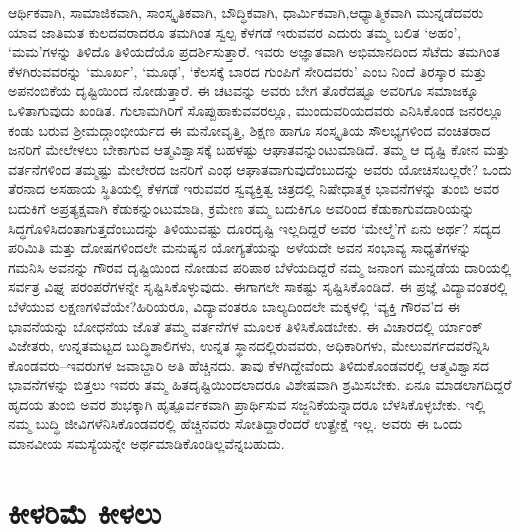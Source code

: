 ಆರ್ಥಿಕವಾಗಿ, ಸಾಮಾಜಿಕವಾಗಿ, ಸಾಂಸ್ಕೃತಿಕವಾಗಿ, ಬೌದ್ಧಿಕವಾಗಿ, ಧಾರ್ಮಿಕವಾಗಿ,\break ಆಧ್ಯಾತ್ಮಿಕವಾಗಿ ಮುನ್ನಡೆದವರು ಯಾವ ಜಾತಿಮತ ಕುಲದವರಾದರೂ ತಮಗಿಂತ ಸ್ವಲ್ಪ ಕೆಳಗಡೆ ಇರುವವರ ಎದುರು ತಮ್ಮ ಬಲಿತ ‘ಅಹಂ’, ‘ಮಮ’ಗಳನ್ನು ತಿಳಿದೊ ತಿಳಿಯದೆಯೊ ಪ್ರದರ್ಶಿಸು\-ತ್ತಾರೆ. ಇವರು ಅಜ್ಞಾತವಾಗಿ ಅಭಿಮಾನದಿಂದ ಸೆಟೆದು ತಮಗಿಂತ ಕೆಳಗಿರುವವರನ್ನು ‘ಮೂರ್ಖ’, ‘ಮೂಢ’, ‘ಕೆಲಸಕ್ಕೆ ಬಾರದ ಗುಂಪಿಗೆ ಸೇರಿದವರು’ ಎಂಬ ನಿಂದೆ ತಿರಸ್ಕಾರ ಮತ್ತು ಅಪನಂಬಿಕೆಯ ದೃಷ್ಟಿಯಿಂದ ನೋಡುತ್ತಾರೆ. ಈ ಚಟವನ್ನು ಅವರು ಬೇಗ ತೊರೆದಷ್ಟೂ ಅವರಿಗೂ ಸಮಾಜಕ್ಕೂ ಒಳಿತಾಗುವುದು ಖಂಡಿತ. ಗುಲಾಮಗಿರಿಗೆ ಸೊಪ್ಪುಹಾಕುವವರಲ್ಲೂ, ಮುಂದುವರಿಯದವರು ಎನಿಸಿಕೊಂಡ ಜನರಲ್ಲೂ ಕಂಡು ಬರುವ ಶ‍್ರೀಮದ್ಗಾಂಭೀರ್ಯದ ಈ ಮನೋವೃತ್ತಿ, ಶಿಕ್ಷಣ ಹಾಗೂ ಸಂಸ್ಕೃತಿಯ ಸೌಲಭ್ಯಗಳಿಂದ ವಂಚಿತರಾದ ಜನರಿಗೆ ಮೇಲೇಳಲು ಬೇಕಾಗುವ ಆತ್ಮ\-ವಿಶ್ವಾಸಕ್ಕೆ ಬಹಳಷ್ಟು ಆಘಾತವನ್ನುಂಟುಮಾಡಿದೆ. ತಮ್ಮ ಆ ದೃಷ್ಟಿ ಕೋನ ಮತ್ತು ವರ್ತನೆಗಳಿಂದ ತಮ್ಮಷ್ಟು ಮೇಲೇರದ ಜನರಿಗೆ ಎಂಥ ಆಘಾತವಾಗುವುದೆಂಬುದನ್ನು ಅವರು ಯೋಚಿಸಬಲ್ಲರೇ? ಒಂದು ತೆರನಾದ ಅಸಹಾಯ ಸ್ಥಿತಿಯಲ್ಲಿ ಕೆಳಗಡೆ ಇರುವವರ ಸ್ವವ್ಯಕ್ತಿತ್ವ ಚಿತ್ರದಲ್ಲಿ ನಿಷೇಧಾತ್ಮಕ ಭಾವನೆಗಳನ್ನು ತುಂಬಿ ಅವರ ಬದುಕಿಗೆ ಅಪ್ರತ್ಯಕ್ಷವಾಗಿ ಕೆಡುಕನ್ನುಂಟುಮಾಡಿ, ಕ್ರಮೇಣ ತಮ್ಮ ಬದುಕಿಗೂ ಅವರಿಂದ ಕೆಡುಕಾಗುವದಾರಿಯನ್ನು ಸಿದ್ಧಗೊಳಿಸಿದಂತಾಗುತ್ತದೆಂಬುದನ್ನು ತಿಳಿಯು\-ವಷ್ಟು ದೂರದೃಷ್ಟಿ ಇಲ್ಲದಿದ್ದರೆ ಅವರ ‘ಮೇಲ್ಮೆ’ಗೆ ಏನು ಅರ್ಥ? ಸದ್ಯದ ಪರಿಮಿತಿ ಮತ್ತು ದೋಷಗಳಿಂದಲೇ ಮನುಷ್ಯನ ಯೋಗ್ಯತೆಯನ್ನು ಅಳೆಯದೇ ಅವನ ಸಂಭಾವ್ಯ ಸಾಧ್ಯತೆಗಳನ್ನು ಗಮನಿಸಿ ಅವನನ್ನು ಗೌರವ ದೃಷ್ಟಿಯಿಂದ ನೋಡುವ ಪರಿಪಾಠ ಬೆಳೆಯದಿದ್ದರೆ ನಮ್ಮ ಜನಾಂಗ ಮುನ್ನಡೆಯ ದಾರಿಯಲ್ಲಿ ಸರ್ವತ್ರ ವಿಘ್ನ ಪರಂಪರೆಗಳನ್ನೇ ಸೃಷ್ಟಿಸಿಕೊಳ್ಳುವುದು. ಈಗಾಗಲೇ ಸಾಕಷ್ಟು ಸೃಷ್ಟಿಸಿಕೊಂಡಿದೆ. ಈ ಪ್ರಜ್ಞೆ ವಿದ್ಯಾವಂತರಲ್ಲಿ ಬೆಳೆಯುವ ಲಕ್ಷಣಗಳಿವೆಯೇ?\break ಹಿರಿಯರೂ, ವಿದ್ಯಾವಂತರೂ ಬಾಲ್ಯದಿಂದಲೇ ಮಕ್ಕಳಲ್ಲಿ ‘ವ್ಯಕ್ತಿ ಗೌರವ’ದ ಈ ಭಾವನೆಯನ್ನು ಬೋಧನೆಯ ಜೊತೆ ತಮ್ಮ ವರ್ತನೆಗಳ ಮೂಲಕ ತಿಳಿಸಿಕೊಡಬೇಕು. ಈ ವಿಚಾರದಲ್ಲಿ ರ್ಯಾಂಕ್ ವಿಜೇತರು, ಉನ್ನತಮಟ್ಟದ ಬುದ್ಧಿಶಾಲಿಗಳು, ಉನ್ನತ ಸ್ಥಾನದಲ್ಲಿರುವವರು, ಅಧಿಕಾರಿಗಳು, ಮೇಲುವರ್ಗದವರೆನ್ನಿಸಿ ಕೊಂಡವರು–ಇವರುಗಳ ಜವಾಬ್ದಾರಿ ಅತಿ ಹೆಚ್ಚಿನದು. ತಾವು ಕೆಳಗಿದ್ದೇವೆಂದು ತಿಳಿದುಕೊಂಡವರಲ್ಲಿ ಆತ್ಮವಿಶ್ವಾಸದ ಭಾವನೆಗಳನ್ನು ಬಿತ್ತಲು ಇವರು ತಮ್ಮ ಹಿತದೃಷ್ಟಿ\-ಯಿಂದಲಾದರೂ ವಿಶೇಷವಾಗಿ ಶ್ರಮಿಸಬೇಕು. ಏನೂ ಮಾಡಲಾಗದಿದ್ದರೆ ಹೃದಯ ತುಂಬಿ ಅವರ ಶುಭಕ್ಕಾಗಿ ಹೃತ್ಪೂರ್ವಕವಾಗಿ ಪ್ರಾರ್ಥಿಸುವ ಸಜ್ಜನಿಕೆಯನ್ನಾದರೂ ಬೆಳಸಿಕೊಳ್ಳಬೇಕು. ಇಲ್ಲಿ ನಮ್ಮ ಬುದ್ಧಿ ಜೀವಿಗಳೆನಿಸಿಕೊಂಡವರಲ್ಲಿ ಹೆಚ್ಚಿನವರು ಸೋತಿದ್ದಾರೆಂದರೆ ಉತ್ಪ್ರೇಕ್ಷೆ ಇಲ್ಲ. ಅವರು ಈ ಒಂದು ಮಾನವೀಯ ಸಮಸ್ಯೆಯನ್ನೇ ಅರ್ಥಮಾಡಿಕೊಂಡಿಲ್ಲವೆನ್ನಬಹುದು.


\section*{ಕೀಳರಿಮೆ ಕೀಳಲು}


